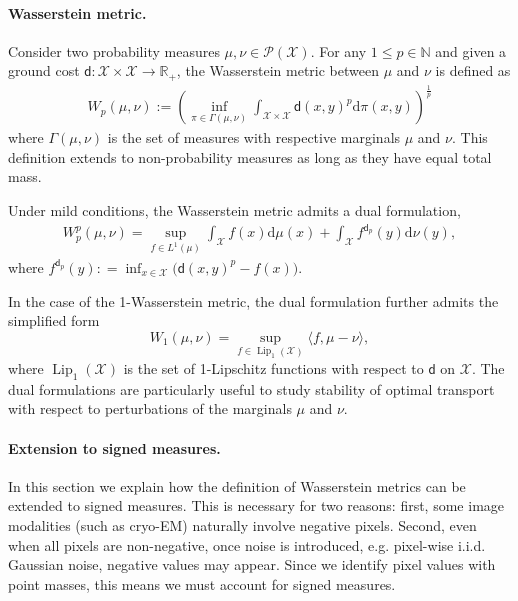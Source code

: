 \documentclass{article}
\theoremstyle{plain}
\theoremstyle{definition}
\theoremstyle{remark}
\providecommand{\diff}{\mathrm{d}}
\newcommand{\R}{\mathbb{R}}
\begin{document}
\paragraph{Wasserstein metric.} Consider two probability measures $\mu,\nu \in \mathcal{P}(\mathcal{X})$. For any $1 \le p \in \mathbb{N}$ and given a ground cost $\mathsf{d}: \mathcal{X} \times \mathcal{X} \to \R_+$, the Wasserstein metric between $\mu$ and $\nu$ is defined as
\begin{align}
    W_p(\mu,\nu) := \left( \inf_{\pi \in \Gamma(\mu,\nu)} \int_{\mathcal{X} \times \mathcal{X}} \mathsf{d}(x,y)^p \diff \pi(x,y) \right)^{\tfrac{1}{p}}
\end{align}
where $\Gamma(\mu,\nu)$ is the set of measures with respective marginals $\mu$ and $\nu$.
This definition extends to non-probability measures as long as they have equal total mass.

Under mild conditions, 
the Wasserstein metric admits a dual formulation, \citep[Theorem~1.39]{Santambrogio2015} 
\begin{align}
 W_p^p(\mu,\nu) = \sup_{f \in L^1(\mu) } \int_\mathcal{X} f(x) \diff \mu(x) + \int_\mathcal{X}  f^{\mathsf{d}_p}(y) \diff \nu(y),
\end{align}
where  \(f^{\mathsf{d}_p}(y): = \inf_{x\in \mathcal{X}} \big( \mathsf{d}(x,y)^p - f(x)\big).\)

In the case of the 1-Wasserstein metric, the dual formulation further admits the simplified form
\begin{equation}
\label{eq: DualW1}
W_1(\mu,\nu) = \sup_{f \in \operatorname{Lip}_1(\mathcal{X})} \langle f, \mu -\nu\rangle,
\end{equation}
where $\operatorname{Lip}_1(\mathcal{X})$ is the set of 1-Lipschitz functions with respect to $\mathsf{d}$ on $\mathcal{X}$. The dual formulations are particularly useful to study stability of optimal transport with respect to perturbations of the marginals $\mu$ and $\nu$.

\paragraph{Extension to signed measures.}
\label{subsection: Case of negative measures}
In this section we explain how the definition of Wasserstein metrics can be extended to signed measures.
This is necessary for two reasons: first, some image modalities (such as cryo-EM) naturally involve negative pixels. Second,
even when all pixels are non-negative, once noise is introduced, e.g. pixel-wise i.i.d. Gaussian noise, negative values may appear.
Since we identify pixel values with point masses, this means we must account for signed measures.
\end{document}
